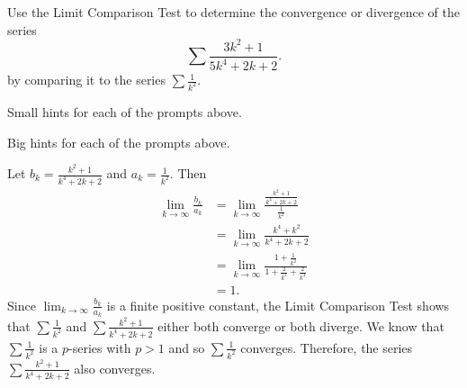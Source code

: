 \begin{activity} \label{8.3.Act7} Use the Limit Comparison Test to determine the convergence or divergence of the series
\[\sum \frac{3k^2+1}{5k^4+2k+2}.\]
by comparing it to the series $ \sum \frac{1}{k^2}$.

\end{activity}

\begin{smallhint}
\ba
	\item Small hints for each of the prompts above.
\ea
\end{smallhint}
\begin{bighint}
\ba
	\item Big hints for each of the prompts above.
\ea
\end{bighint}
\begin{activitySolution}
Let $b_k = \frac{k^2+1}{k^4+2k+2}$ and $a_k = \frac{1}{k^2}$. Then
\begin{align*}
\lim_{k \to \infty} \frac{b_k}{a_k} &= \lim_{k \to \infty} \frac{\frac{k^2+1}{k^4+2k+2}}{\frac{1}{k^2}} \\
    &= \lim_{k \to \infty} \frac{k^4+k^2}{k^4+2k+2} \\
    &= \lim_{k \to \infty} \frac{1+\frac{1}{k^2}}{1+\frac{2}{k^3}+\frac{2}{k^4}} \\
    &= 1.
\end{align*}
 Since $ \lim_{k \to \infty} \frac{b_k}{a_k}$ is a finite positive constant, the Limit Comparison Test shows that $ \sum \frac{1}{k^2}$ and $ \sum \frac{k^2+1}{k^4+2k+2}$ either both converge or both diverge. We know that $ \sum \frac{1}{k^2}$ is a $p$-series with $p > 1$ and so $ \sum \frac{1}{k^2}$  converges. Therefore, the series $ \sum \frac{k^2+1}{k^4+2k+2}$ also converges.
\end{activitySolution}
\aftera 